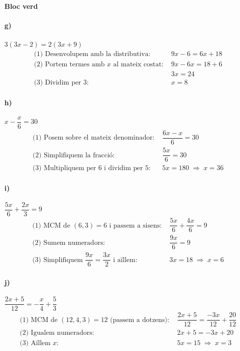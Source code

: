 \documentclass[11pt,a4paper]{article}
\begin{document}
\textbf{Bloc verd}

\paragraph{g)} $3(3x - 2) = 2(3x + 9)$
\[
\begin{aligned}
\text{(1) Desenvolupem amb la distributiva: } & 9x - 6 = 6x + 18 \\
\text{(2) Portem termes amb $x$ al mateix costat: } & 9x - 6x = 18 + 6 \\
& 3x = 24 \\
\text{(3) Dividim per 3: } & \boxed{x = 8}
\end{aligned}
\]

\paragraph{h)} $x - \dfrac{x}{6} = 30$
\[
\begin{aligned}
\text{(1) Posem sobre el mateix denominador: } & \dfrac{6x - x}{6} = 30 \\
\text{(2) Simplifiquem la fracció: } & \dfrac{5x}{6} = 30 \\
\text{(3) Multipliquem per 6 i dividim per 5: } & 5x = 180 \;\Rightarrow\; \boxed{x = 36}
\end{aligned}
\]

\paragraph{i)} $\dfrac{5x}{6} + \dfrac{2x}{3} = 9$
\[
\begin{aligned}
\text{(1) MCM de }(6,3)=6 \text{ i passem a sisens: } & \dfrac{5x}{6} + \dfrac{4x}{6} = 9 \\
\text{(2) Sumem numeradors: } & \dfrac{9x}{6} = 9 \\
\text{(3) Simplifiquem } \dfrac{9x}{6}=\dfrac{3x}{2}\text{ i aïllem: } & 3x = 18 \;\Rightarrow\; \boxed{x = 6}
\end{aligned}
\]

\paragraph{j)} $\dfrac{2x + 5}{12} = -\dfrac{x}{4} + \dfrac{5}{3}$
\[
\begin{aligned}
\text{(1) MCM de }(12,4,3)=12 \text{ (passem a dotzens): } &
\dfrac{2x + 5}{12} = \dfrac{-3x}{12} + \dfrac{20}{12} \\
\text{(2) Igualem numeradors: } & 2x + 5 = -3x + 20 \\
\text{(3) Aïllem } x: & 5x = 15 \;\Rightarrow\; \boxed{x = 3}
\end{aligned}
\]
\end{document}
